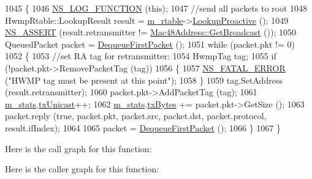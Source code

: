\begin{DoxyCode}
1045 \{
1046   \hyperlink{log-macros-disabled_8h_a90b90d5bad1f39cb1b64923ea94c0761}{NS\_LOG\_FUNCTION} (\textcolor{keyword}{this});
1047   \textcolor{comment}{//send all packets to root}
1048   HwmpRtable::LookupResult result = \hyperlink{classns3_1_1dot11s_1_1HwmpProtocol_a12fda0e3e5a400888c8ba1a87c1a7216}{m\_rtable}->\hyperlink{classns3_1_1dot11s_1_1HwmpRtable_ad4bed27ab37ab1bc606802b763225a23}{LookupProactive} ();
1049   \hyperlink{assert_8h_a6dccdb0de9b252f60088ce281c49d052}{NS\_ASSERT} (result.retransmitter != \hyperlink{classns3_1_1Mac48Address_a55156e302c6bf950c0b558365adbde84}{Mac48Address::GetBroadcast} ());
1050   QueuedPacket packet = \hyperlink{classns3_1_1dot11s_1_1HwmpProtocol_a0e47fb414214051029105abc662db296}{DequeueFirstPacket} ();
1051   \textcolor{keywordflow}{while} (packet.pkt != 0)
1052     \{
1053       \textcolor{comment}{//set RA tag for retransmitter:}
1054       HwmpTag tag;
1055       \textcolor{keywordflow}{if} (!packet.pkt->RemovePacketTag (tag))
1056         \{
1057           \hyperlink{group__fatal_ga5131d5e3f75d7d4cbfd706ac456fdc85}{NS\_FATAL\_ERROR} (\textcolor{stringliteral}{"HWMP tag must be present at this point"});
1058         \}
1059       tag.SetAddress (result.retransmitter);
1060       packet.pkt->AddPacketTag (tag);
1061       \hyperlink{classns3_1_1dot11s_1_1HwmpProtocol_a478a13e7ec9ca167a5b13b38237d17ae}{m\_stats}.\hyperlink{structns3_1_1dot11s_1_1HwmpProtocol_1_1Statistics_a7d9d31219b5c2b3a713ba09ddd43044a}{txUnicast}++;
1062       \hyperlink{classns3_1_1dot11s_1_1HwmpProtocol_a478a13e7ec9ca167a5b13b38237d17ae}{m\_stats}.\hyperlink{structns3_1_1dot11s_1_1HwmpProtocol_1_1Statistics_a507c7a9383e255dd2402d42c8218b416}{txBytes} += packet.pkt->GetSize ();
1063       packet.reply (\textcolor{keyword}{true}, packet.pkt, packet.src, packet.dst, packet.protocol, result.ifIndex);
1064 
1065       packet = \hyperlink{classns3_1_1dot11s_1_1HwmpProtocol_a0e47fb414214051029105abc662db296}{DequeueFirstPacket} ();
1066     \}
1067 \}
\end{DoxyCode}


Here is the call graph for this function\+:




Here is the caller graph for this function\+:


